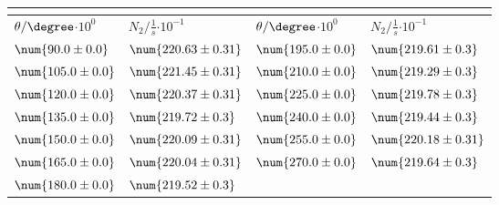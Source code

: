 \begin{tabular}{|p{}|p{}||p{}|p{}|}
\hline
\multicolumn{4}{|c|}{}\\
\hline
$\theta/\degree$$\cdot 10^{0}$&$N_2/\frac{1}{s}$$\cdot 10^{-1}$&$\theta/\degree$$\cdot 10^{0}$&$N_2/\frac{1}{s}$$\cdot 10^{-1}$\\
\hline
$\num{90.0\pm 0.0}$&$\num{220.63\pm 0.31}$&$\num{195.0\pm 0.0}$&$\num{219.61\pm 0.3}$\\
$\num{105.0\pm 0.0}$&$\num{221.45\pm 0.31}$&$\num{210.0\pm 0.0}$&$\num{219.29\pm 0.3}$\\
$\num{120.0\pm 0.0}$&$\num{220.37\pm 0.31}$&$\num{225.0\pm 0.0}$&$\num{219.78\pm 0.3}$\\
$\num{135.0\pm 0.0}$&$\num{219.72\pm 0.3}$&$\num{240.0\pm 0.0}$&$\num{219.44\pm 0.3}$\\
$\num{150.0\pm 0.0}$&$\num{220.09\pm 0.31}$&$\num{255.0\pm 0.0}$&$\num{220.18\pm 0.31}$\\
$\num{165.0\pm 0.0}$&$\num{220.04\pm 0.31}$&$\num{270.0\pm 0.0}$&$\num{219.64\pm 0.3}$\\
$\num{180.0\pm 0.0}$&$\num{219.52\pm 0.3}$&&\\
\hline
\end{tabular}